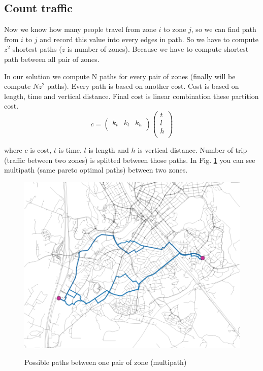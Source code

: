 \subsection{Count traffic}
Now we know how many people travel from zone $i$ to zone $j$, so we can find path from $i$ to $j$ and 
record this value into every edges in path. So we have to compute $z^2$ shortest paths ($z$ is number of zones). Because we have to compute shortest path between all pair of zones.

In our solution we compute N paths for every pair of zones (finally will be compute $N z^2$ paths). Every path is based on another cost. Cost is based on length, time and vertical distance. Final cost is linear combination these partition cost.
$$c = \left(\begin{array}{ccc}
k_t & k_l & k_h\\
\end{array}\right) \left( \begin{array}{c}
t\\
l\\
h\\
\end{array} \right)$$

where $c$ is cost, $t$ is time, $l$ is length and $h$ is vertical distance. Number of trip (traffic between two zones) is splitted between those paths. In Fig. \ref{img.paths} you can see multipath (same pareto optimal paths) between two zones.
\begin{figure}
\includegraphics[width=12cm]{img/c01-transp-model/paths.png}
\label{img.paths}
\caption{Possible paths between one pair of zone (multipath)}
\end{figure}